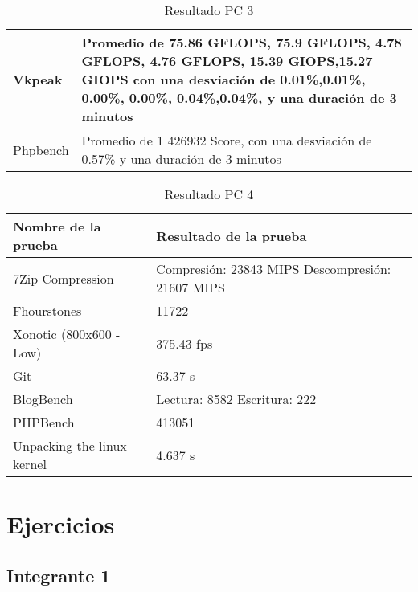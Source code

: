 \documentclass[12pt]{article}
\begin{document}
\begin{table}[!htb]
\begin{tabular}{|p{5cm}|p{9cm}|}
        \hline
        Vkpeak & Promedio de 75.86 GFLOPS, 75.9 GFLOPS, 4.78 GFLOPS, 4.76 GFLOPS, 15.39 GIOPS,15.27 GIOPS\newline
        con una desviación de 0.01\%,0.01\%, 0.00\%, 0.00\%, 0.04\%,0.04\%, \newline
        y una duración de 3 minutos \\
        \hline
        Phpbench & Promedio de 1 426932 Score, \newline
        con una desviación de 0.57\% \newline
        y una duración de 3 minutos \\
        \hline
    \end{tabular}
    \caption{Resultado PC 3}
\end{table}

\begin{table}[!htb]
    \centering
    \begin{tabular}{|p{5cm}|p{9cm}|}
        \hline
        \textbf{Nombre de la prueba} & \textbf{Resultado de la prueba}\\
        \hline
        7Zip Compression & Compresión: 23843 MIPS \newline 
        Descompresión: 21607 MIPS \\
        \hline
        Fhourstones & 11722 \\
        \hline
        Xonotic (800x600 - Low) &  375.43 fps\\
        \hline
        Git & 63.37 s\\
        \hline
        BlogBench & Lectura: 8582 \newline
        Escritura: 222 \\
        \hline
        PHPBench &  413051\\
        \hline
        Unpacking the linux kernel & 4.637 s\\
        \hline
    \end{tabular}
    \caption{Resultado PC 4}
\end{table}

\newpage
\section{Ejercicios}
\subsection{Integrante 1}
\end{document}
